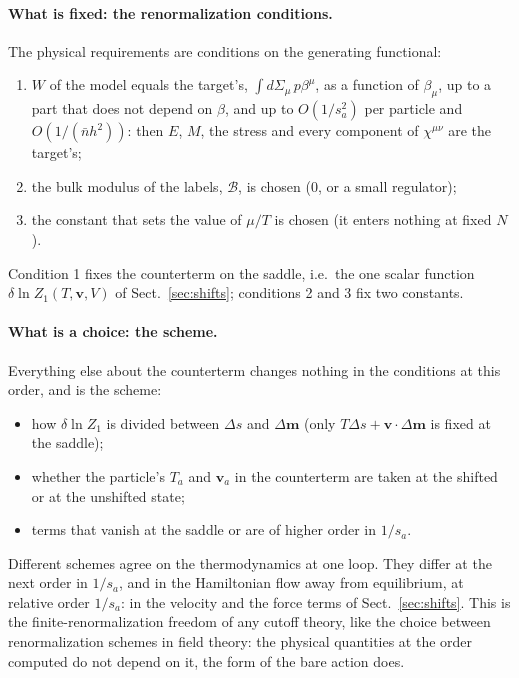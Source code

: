 \documentclass[11pt,aps,preprint,nofootinbib,superscriptaddress,tightenlines]{revtex4-2}
\newcommand{\klab}{\mathcal B}
\def\Sect#1{Sect.~\ref{#1}}
\let\oldparagraph\paragraph
\renewcommand{\paragraph}{\par\bigskip\oldparagraph}
\begin{document}
\paragraph{What is fixed: the renormalization conditions.}  The physical requirements are conditions on the generating functional:
\begin{enumerate}
\item $W$ of the model equals the target's, $\int d\Sigma_\mu\,p\beta^\mu$, as a function of $\beta_\mu$, up to a part that does not depend on $\beta$, and up to $O(1/s_a^2)$ per particle
  and $O(1/(\bar nh^2))$: then $E$, $M$, the stress and every component of $\chi^{\mu\nu}$ are the target's;
\item the bulk modulus of the labels, $\klab$, is chosen ($0$, or a small regulator);
\item the constant that sets the value of $\mu/T$ is chosen (it enters nothing at fixed $N$).
\end{enumerate}
Condition 1 fixes the counterterm on the saddle, i.e.\ the one scalar function $\delta\ln Z_1(T,\bm v,V)$ of \Sect{sec:shifts}; conditions 2 and 3 fix two constants.

\paragraph{What is a choice: the scheme.}  Everything else about the counterterm changes nothing in the conditions at this order, and is the scheme:
\begin{itemize}
\item how $\delta\ln Z_1$ is divided between $\Delta s$ and $\Delta\bm m$ (only $T\Delta s+\bm v\cdot\Delta\bm m$ is fixed at the saddle);
\item whether the particle's $T_a$ and $\bm v_a$ in the counterterm are taken at the shifted or at the unshifted state;
\item terms that vanish at the saddle or are of higher order in $1/s_a$.
\end{itemize}
Different schemes agree on the thermodynamics at one loop.  They differ at the next order in $1/s_a$, and in the Hamiltonian flow away from equilibrium, at relative order
$1/s_a$: in the velocity and the force terms of \Sect{sec:shifts}.  This is the finite-renormalization freedom of any cutoff theory, like the choice between
renormalization schemes in field theory: the physical quantities at the order computed do not depend on it, the form of the bare action does.
\end{document}
